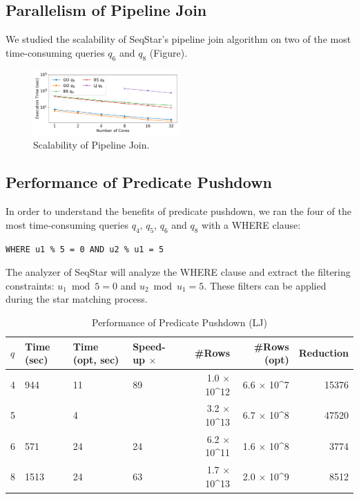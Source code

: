 \subsection{Parallelism of Pipeline Join}\label{sec:experiments_join}
We studied the scalability of SeqStar's pipeline join algorithm on two of the most time-consuming queries $q_6$ and $q_8$ (Figure).

\begin{figure}[ht]
  \centering
  \includegraphics[width=0.5\textwidth]{img/exp_scalability.pdf}
  \caption{Scalability of Pipeline Join.}\label{img:exp_scalability}
\end{figure}

\subsection{Performance of Predicate Pushdown}
In order to understand the benefits of predicate pushdown,
we ran the four of the most time-consuming queries $q_4$, $q_5$, $q_6$ and $q_8$ with a WHERE clause:
\begin{Verbatim}[fontsize=\small]
  WHERE u1 % 5 = 0 AND u2 % u1 = 5
\end{Verbatim}
The analyzer of SeqStar will analyze the WHERE clause and extract the filtering constraints:
$u_1 \bmod 5 = 0$ and $u_2 \bmod u_1 = 5$.
These filters can be applied during the star matching process.

\begin{table}
  \caption{Performance of Predicate Pushdown (LJ)}\label{tab:pushdown_lj}
  \begin{tabular}{l|p{5mm}p{5mm}p{7mm}|rrr}
    \toprule
    $q$ & Time (sec) & Time (opt, sec) & Speed-up $\times$ & \#Rows & \#Rows (opt) & Reduction \\
    \midrule
    4 &   944 &        11 &       89 &   1.0 $\times$ 10^{12} &      6.6 $\times$ 10^7 &      15376 \\
    5 &     &         4 &        &        3.2 $\times$ 10^{13}  &     6.7 $\times$ 10^8 &     47520   \\
    6 &   571 &        24 &       24 &    6.2 $\times$ 10^{11} &     1.6 $\times$ 10^8 &       3774 \\
    8 &  1513 &        24 &       63 &  1.7 $\times$ 10^{13} &    2.0 $\times$ 10^9&       8512 \\
    \bottomrule
  \end{tabular}
\end{table}

